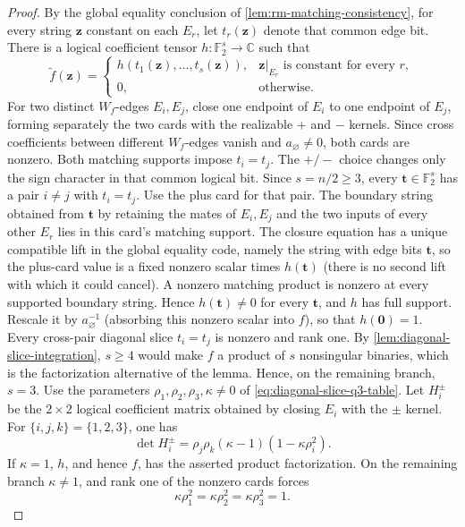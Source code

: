 \documentclass[11pt,letterpaper,onecolumn]{article}
\theoremstyle{plain}
\theoremstyle{definition}
\theoremstyle{remark}
\newcommand{\Ftwo}{\mathbb F_2}
\newcommand{\zero}{\mathbf 0}
\begin{document}
\begin{proof}
By the global equality conclusion of
\cref{lem:rm-matching-consistency}, for every string \({\mathbf z}\) constant on each
\(E_r\), let \(t_r({\mathbf z})\) denote that common edge bit.  There is a logical
coefficient tensor \(h:\Ftwo^s\to\mathbb C\) such that
\begin{equation*}
  \widetilde f({\mathbf z})=
  \begin{cases}
    h(t_1({\mathbf z}),\ldots,t_s({\mathbf z})),
      &{\mathbf z}|_{E_r}\text{ is constant for every }r,\\
    0,&\text{otherwise}.
  \end{cases}
\end{equation*}
For two distinct \(W_f\)-edges \(E_i,E_j\), close one endpoint of \(E_i\)
to one endpoint of \(E_j\), forming separately the two cards with the
realizable \(+\) and \(-\) kernels.  Since
cross coefficients between different \(W_f\)-edges vanish and
\(a_\varnothing\ne0\), both cards are nonzero.  Both matching supports
impose \(t_i=t_j\). The \(+/-\) choice changes only the sign character in
that common logical bit.  Since \(s=n/2\ge3\),
every \({\mathbf t}\in\Ftwo^s\) has a pair \(i\ne j\) with \(t_i=t_j\). Use the
plus card for that pair.  The boundary string obtained from \({\mathbf t}\)
by retaining the mates of \(E_i,E_j\) and the two inputs of every other
\(E_r\) lies in this card's matching support.  The closure equation has a
unique compatible lift in the global equality code, namely the string with
edge bits \({\mathbf t}\), so the plus-card value is a fixed nonzero scalar times \(h({\mathbf t})\)
(there is no second lift with which it could cancel).  A nonzero matching
product is nonzero at every supported boundary string. Hence \(h({\mathbf t})\ne0\) for
every \({\mathbf t}\), and \(h\) has full support.
Rescale it by \(a_\varnothing^{-1}\) (absorbing
this nonzero scalar into \(f\)), so that \(h(\zero)=1\).  Every cross-pair
diagonal slice \(t_i=t_j\) is nonzero and rank one.  By
\cref{lem:diagonal-slice-integration},
\(s\ge4\) would make \(f\) a product of \(s\) nonsingular binaries, which
is the factorization alternative of the lemma.  Hence, on the remaining
branch, \(s=3\). Use the parameters
\(\rho_1,\rho_2,\rho_3,\kappa\ne0\) of
\cref{eq:diagonal-slice-q3-table}.  Let \(H_i^\pm\) be the \(2\times2\)
logical coefficient matrix obtained by closing \(E_i\) with the \(\pm\)
kernel.  For \(\{i,j,k\}=\{1,2,3\}\), one has
\begin{equation*}
  \det H_i^{\pm}
  =\rho_j \rho_k(\kappa-1)(1-\kappa \rho_i^2).
\end{equation*}
If \(\kappa=1\), \(h\), and hence \(f\), has the asserted product
factorization.  On the remaining branch \(\kappa\ne1\), and rank one of the
nonzero cards forces
\begin{equation*}
  \kappa \rho_1^2=\kappa \rho_2^2=\kappa \rho_3^2=1.
\end{equation*}


\end{proof}
\end{document}
